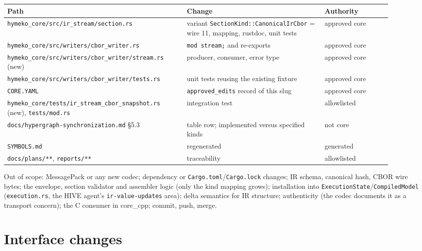 \documentclass[11pt,a4paper]{article}
\begin{document}
\begin{longtable}{@{}L{0.43\linewidth}L{0.33\linewidth}L{0.16\linewidth}@{}}
\toprule
Path & Change & Authority \\
\midrule
\texttt{hymeko\_core/src/ir\_stream/section.rs} & variant \texttt{SectionKind::CanonicalIrCbor} = wire 11, mapping,
rustdoc, unit tests & approved core \\
\texttt{hymeko\_core/src/writers/cbor\_writer.rs} & \texttt{mod stream;} and re-exports & approved core \\
\texttt{hymeko\_core/src/writers/cbor\_writer/stream.rs} (new) & producer, consumer, error type & approved core \\
\texttt{hymeko\_core/src/writers/cbor\_writer/tests.rs} & unit tests reusing the existing fixture & approved core \\
\texttt{CORE.YAML} & \texttt{approved\_edits} record of this slug & approved core \\
\texttt{hymeko\_core/tests/ir\_stream\_cbor\_snapshot.rs} (new), \texttt{tests/mod.rs} & integration test &
allowlisted \\
\texttt{docs/hypergraph-synchronization.md} \S5.3 & table row; implemented versus specified kinds & not core \\
\texttt{SYMBOLS.md} & regenerated & generated \\
\texttt{docs/plans/**}, \texttt{reports/**} & traceability & allowlisted \\
\bottomrule
\end{longtable}

Out of scope: MessagePack or any new codec; dependency or \texttt{Cargo.toml}/\texttt{Cargo.lock} changes; IR schema,
canonical hash, CBOR wire bytes; the envelope, section validator and assembler logic (only the kind mapping grows);
installation into \texttt{ExecutionState}/\texttt{CompiledModel} (\texttt{execution.rs}, the HIVE agent's
\texttt{ir-value-updates} area); delta semantics for IR structure; authenticity (the codec documents it as a transport
concern); the C consumer in core\_cpp; commit, push, merge.

\section{Interface changes}
\end{document}
